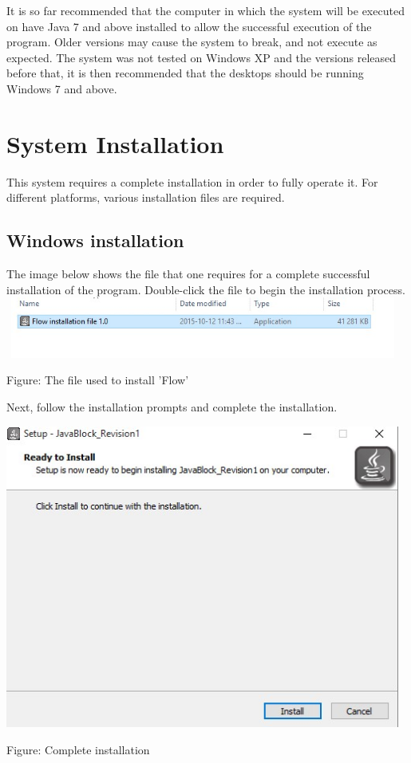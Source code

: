\documentclass[11pt,a4paper,titlepage]{article}
\begin{document}
		It is so far recommended that the computer in which the system will be executed on have Java 7 and above installed to allow the successful execution of the program. Older versions may cause the system to break, and not execute as expected. The system was not tested on Windows XP and the versions released before that, it is then recommended that the desktops should be running Windows 7 and above.\newline		
		
\section{System Installation}
		
		This system requires a complete installation in order to fully operate it. For different platforms, various installation files are required. \newline
		

		\subsection{Windows installation}
		
		The image below shows the file that one requires for a complete successful installation of the program. Double-click the file to begin the installation process. \newline \newline
		\includegraphics[width=13cm, height=2cm]{Install1.jpg}		
		\begin{center}
		Figure: The file used to install 'Flow'
		\end{center}
		
			
		Next, follow the installation prompts and complete the installation. \newline
		
		\includegraphics[width=13cm]{Install2.jpg}		
		\begin{center}
		Figure: Complete installation
		\end{center}
\end{document}
